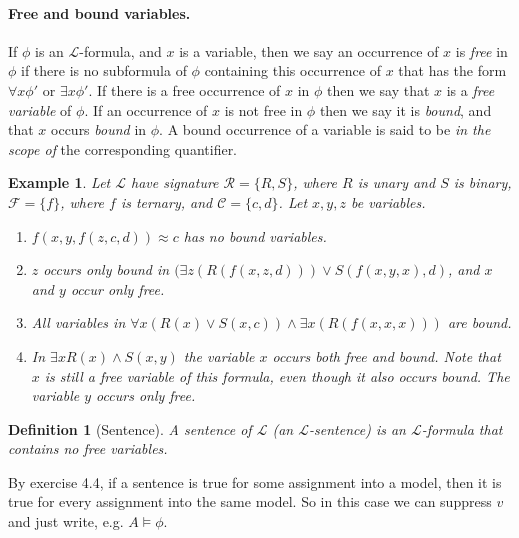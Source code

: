 \documentclass{article}
\theoremstyle{plain}
\newtheorem{definition}[theorem]{Definition}{\bfseries}{\upshape}
\newtheorem{example}[theorem]{Example}{\bfseries}{\upshape}
\newcommand{\cR}{\mathcal{R}}
\newcommand{\cF}{\mathcal{F}}
\newcommand{\cC}{\mathcal{C}}
\newcommand{\sL}{\mathscr{L}}
\begin{document}
\paragraph{Free and bound variables.} 
If $\phi$ is an $\sL$-formula, and $x$ is a variable, then we say an occurrence of $x$ is \emph{free} in $\phi$ if there is no subformula of $\phi$ containing this occurrence of $x$ that has the form $\forall x \phi'$ or $\exists x \phi'$. If there is a free occurrence of $x$ in $\phi$ then we say that $x$ is a \emph{free variable} of $\phi$. If an occurrence of $x$ is not free in $\phi$ then we say it is \emph{bound}, and that $x$ occurs \emph{bound} in $\phi$. A bound occurrence of a variable is said to be \emph{in the scope of} the corresponding quantifier. 

\begin{example}
Let $\sL$ have signature $\cR=\{R,S\}$, where $R$ is unary and $S$ is binary, $\cF=\{f\}$, where $f$ is ternary, and $\cC=\{c,d\}$. Let $x,y,z$ be variables. 
\begin{enumerate}
\item $f(x,y,f(z,c,d)) \approx c$ has no bound variables.
\item $z$ occurs only bound in $(\exists z(R(f(x,z,d)))\vee S(f(x,y,x),d)$, and $x$ and $y$ occur only free.
\item All variables in $\forall x (R(x)\vee S(x,c))\wedge \exists x (R(f(x,x,x)))$ are bound.
\item In $\exists xR(x) \wedge S(x,y)$ the variable $x$ occurs both free and bound. Note that $x$ is still a free variable of this formula, even though it also occurs bound. The variable $y$ occurs only free. 
\end{enumerate}
\end{example}

\begin{definition}[Sentence]
A sentence of $\sL$ (an $\sL$-sentence) is an $\sL$-formula that contains no free variables.
\end{definition}

By exercise 4.4, if a sentence is true for some assignment into a model, then it is true for every assignment into the same model. So in this case we can suppress $v$ and just write, e.g. $A\models \phi$.


 
\end{document}
